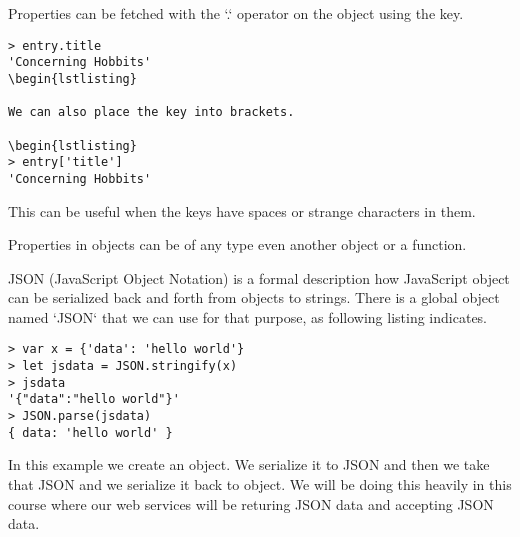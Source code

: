 Properties can be fetched with the `.` operator on the object using the key.

\begin{lstlisting}
> entry.title
'Concerning Hobbits'
\begin{lstlisting}

We can also place the key into brackets.

\begin{lstlisting}
> entry['title']
'Concerning Hobbits'
\end{lstlisting}

This can be useful when the keys have spaces or strange characters in them.

Properties in objects can be of any type even another object or a function.

JSON (JavaScript Object Notation) is a formal description how JavaScript object can be serialized back and forth from objects to strings. There is a global object named `JSON` that we can use for that purpose, as following listing indicates.

\begin{lstlisting}
> var x = {'data': 'hello world'}
> let jsdata = JSON.stringify(x)
> jsdata
'{"data":"hello world"}'
> JSON.parse(jsdata)
{ data: 'hello world' }
\end{lstlisting}

In this example we create an object. We serialize it to JSON and then we take that JSON and we serialize it back to object. We will be doing this heavily in this course where our web services will be returing JSON data and accepting JSON data.


